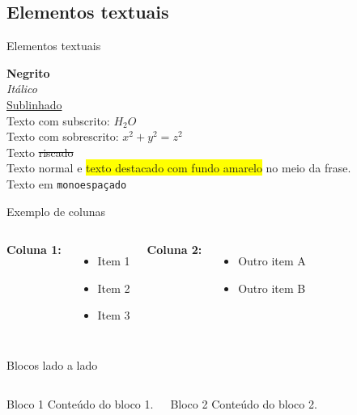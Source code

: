 \documentclass{beamer}
\begin{document}
\subsection{Elementos textuais}
\begin{frame}[fragile]{Elementos textuais}

\textbf{Negrito} \\
\textit{Itálico} \\
\underline{Sublinhado} \\
Texto com subscrito: $H_2O$ \\
Texto com sobrescrito: $x^2 + y^2 = z^2$ \\
Texto \sout{riscado} \\
Texto normal e \colorbox{yellow}{texto destacado com fundo amarelo} no meio da frase. \\
Texto em \texttt{monoespaçado}

\end{frame}

\begin{frame}{Exemplo de colunas}

\begin{columns}[T] %
  \textbf{Coluna 1:}
  \begin{itemize}
    \item Item 1
    \item Item 2
    \item Item 3
  \end{itemize}

  \textbf{Coluna 2:}
  \begin{itemize}
    \item Outro item A
    \item Outro item B
  \end{itemize}
  
\end{columns}

\end{frame}

\begin{frame}{Blocos lado a lado}

\begin{columns}
  \begin{block}{Bloco 1}
  Conteúdo do bloco 1.
  \end{block}

  \begin{alertblock}{Bloco 2}
  Conteúdo do bloco 2.
  \end{alertblock}
\end{columns}

\end{frame}
\end{document}
